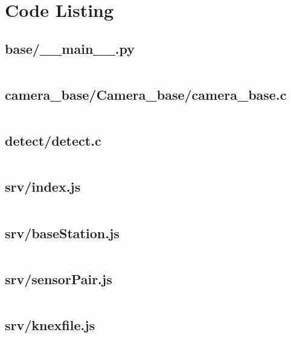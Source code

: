 \chapter{Code Listing}

\section{base/\_\_main\_\_.py}
\label{code:base-main}
\inputminted{python}{../base/__main__.py}

\section{camera\_base/Camera\_base/camera\_base.c}
\label{code:camera-base}
\inputminted{c}{../camera_base/Camera_base/camera_base.c}

\section{detect/detect.c}
\label{code:detect}
\inputminted{c}{../detect/detect.c}


\section{srv/index.js}
\label{code:srv-index}
\inputminted{javascript}{../srv/index.js}

\section{srv/baseStation.js}
\label{code:srv-basestation-api}
\inputminted{javascript}{../srv/baseStation.js}

\section{srv/sensorPair.js}
\label{code:srv-sensorpair-api}
\inputminted{javascript}{../srv/sensorPair.js}

\section{srv/knexfile.js}
\label{code:srv-knexfile}
\inputminted{javascript}{../srv/knexfile.js}

